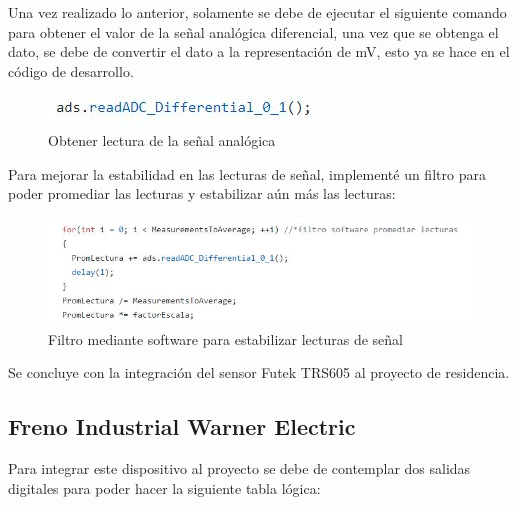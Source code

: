 \documentclass[12pt,titlepage]{article}
\begin{document}
Una vez realizado lo anterior, solamente se debe de ejecutar el siguiente comando para obtener el valor de la señal analógica diferencial, una vez que se obtenga el dato, se debe de convertir el dato a la representación de mV, esto ya se hace en el código de desarrollo. \\ 

\begin{figure}[htbp]
\hspace*{4.9cm} 
\includegraphics[scale=0.78]{comando_leer}
\caption{Obtener lectura de la señal analógica}
\end{figure}

Para mejorar la estabilidad en las lecturas de señal, implementé un filtro para poder promediar las lecturas y estabilizar aún más las lecturas: \\ 

\begin{figure}[htbp]
\hspace*{2.1cm} 
\includegraphics[scale=0.78]{prom}
\caption{Filtro mediante software para estabilizar lecturas de señal}
\end{figure}

Se concluye con la integración del sensor Futek TRS605 al proyecto de residencia. \\
\newpage
\subsection{Freno Industrial Warner Electric}
Para integrar este dispositivo al proyecto se debe de contemplar dos salidas digitales para poder hacer la siguiente tabla lógica: \\ 
\end{document}
